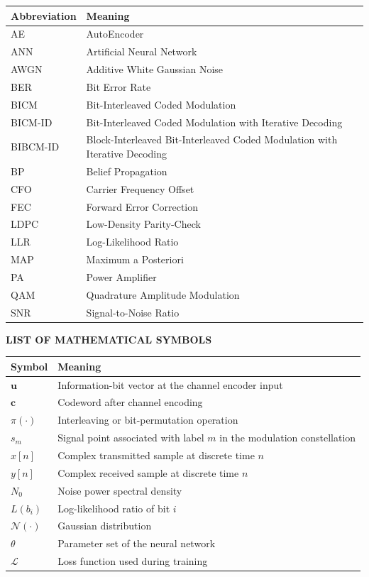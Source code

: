 ﻿\documentclass[a4paper,14pt]{extreport}
\begin{document}
\begin{longtable}{>{\raggedright\arraybackslash}p{3cm}>{\raggedright\arraybackslash}p{11cm}}
\toprule
\textbf{Abbreviation} & \textbf{Meaning}\\
\midrule
AE & AutoEncoder\\
ANN & Artificial Neural Network\\
AWGN & Additive White Gaussian Noise\\
BER & Bit Error Rate\\
BICM & Bit-Interleaved Coded Modulation\\
BICM-ID & Bit-Interleaved Coded Modulation with Iterative Decoding\\
BIBCM-ID & Block-Interleaved Bit-Interleaved Coded Modulation with Iterative Decoding\\
BP & Belief Propagation\\
CFO & Carrier Frequency Offset\\
FEC & Forward Error Correction\\
LDPC & Low-Density Parity-Check\\
LLR & Log-Likelihood Ratio\\
MAP & Maximum a Posteriori\\
PA & Power Amplifier\\
QAM & Quadrature Amplitude Modulation\\
SNR & Signal-to-Noise Ratio\\
\bottomrule
\end{longtable}

\newpage
{}
\begin{center}
  {\bfseries LIST OF MATHEMATICAL SYMBOLS}
\end{center}

\begin{longtable}{p{3cm}p{11cm}}
\toprule
\textbf{Symbol} & \textbf{Meaning}\\
\midrule
$\mathbf{u}$ & Information-bit vector at the channel encoder input\\
$\mathbf{c}$ & Codeword after channel encoding\\
$\pi(\cdot)$ & Interleaving or bit-permutation operation\\
$s_m$ & Signal point associated with label $m$ in the modulation constellation\\
$x[n]$ & Complex transmitted sample at discrete time $n$\\
$y[n]$ & Complex received sample at discrete time $n$\\
$N_0$ & Noise power spectral density\\
$L(b_i)$ & Log-likelihood ratio of bit $i$\\
$\mathcal{N}(\cdot)$ & Gaussian distribution\\
$\theta$ & Parameter set of the neural network\\
$\mathcal{L}$ & Loss function used during training\\
\bottomrule
\end{longtable}
\end{document}
